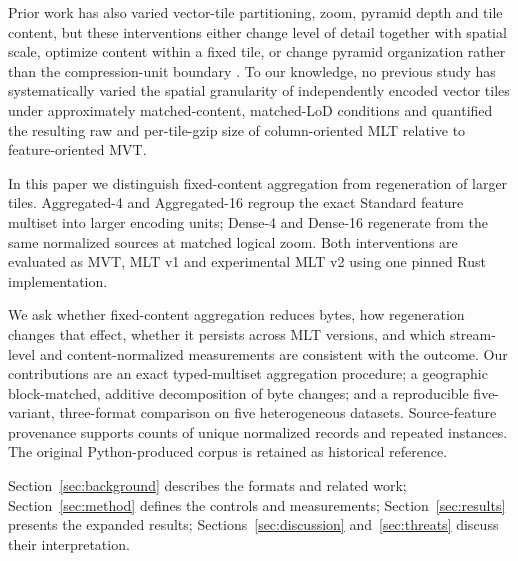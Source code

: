 Prior work has also varied vector-tile partitioning, zoom, pyramid depth and tile
content, but these interventions either change level of detail together with spatial
scale, optimize content within a fixed tile, or change pyramid organization rather than
the compression-unit boundary \citep{li2018geotile, dufilie2014feathered,
bahadori2026hifive, tippecanoe, planetiler_1574}. To our knowledge, no previous study has
systematically varied the spatial granularity of independently encoded vector tiles
under approximately matched-content, matched-LoD conditions and quantified the resulting
raw and per-tile-gzip size of column-oriented MLT relative to feature-oriented MVT.


In this paper we distinguish fixed-content aggregation from regeneration of larger
tiles. Aggregated-4 and Aggregated-16 regroup the exact Standard feature multiset
into larger encoding units; Dense-4 and Dense-16 regenerate from the same normalized
sources at matched logical zoom. Both interventions are evaluated as MVT, MLT v1 and
experimental MLT v2 using one pinned Rust implementation.

We ask whether fixed-content aggregation reduces bytes, how regeneration changes
that effect, whether it persists across MLT versions, and which stream-level and
content-normalized measurements are consistent with the outcome. Our contributions
are an exact typed-multiset aggregation procedure; a geographic block-matched,
additive decomposition of byte changes; and a reproducible five-variant,
three-format comparison on five heterogeneous datasets. Source-feature provenance
supports counts of unique normalized records and repeated instances. The original
Python-produced corpus is retained as historical reference.

Section~\ref{sec:background} describes the formats and related work;
Section~\ref{sec:method} defines the controls and measurements;
Section~\ref{sec:results} presents the expanded results;
Sections~\ref{sec:discussion} and~\ref{sec:threats} discuss their interpretation.
